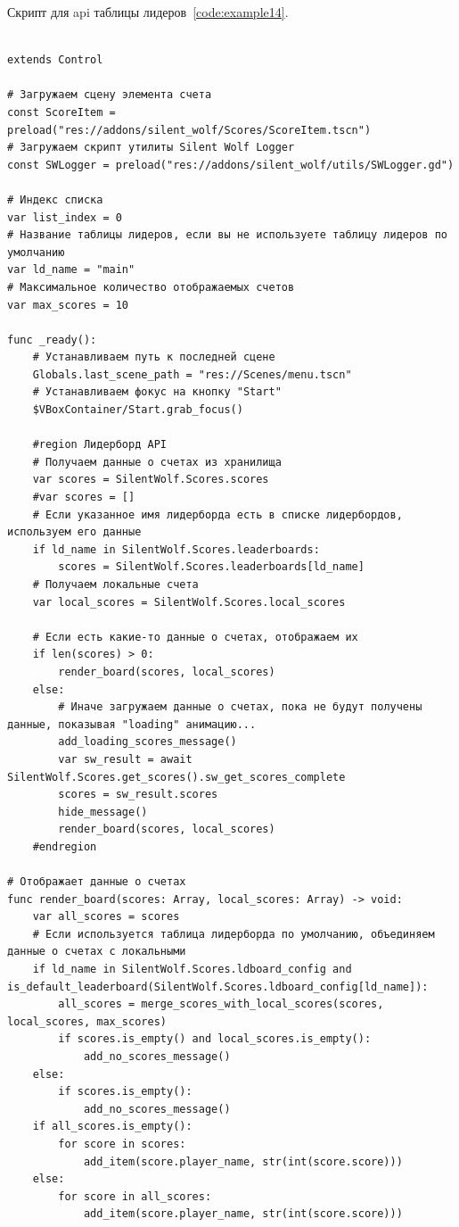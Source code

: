 \label{{subsec:ch02/sec01/sub15}Подраздел 15. Скрипт для api таблицы лидеров}
Скрипт для api таблицы лидеров~\ref{code:example14}.
\begin{code}
\vspace{-\baselineskip}\begin{verbatim}

extends Control

# Загружаем сцену элемента счета
const ScoreItem = preload("res://addons/silent_wolf/Scores/ScoreItem.tscn")
# Загружаем скрипт утилиты Silent Wolf Logger
const SWLogger = preload("res://addons/silent_wolf/utils/SWLogger.gd")

# Индекс списка
var list_index = 0
# Название таблицы лидеров, если вы не используете таблицу лидеров по умолчанию
var ld_name = "main"
# Максимальное количество отображаемых счетов
var max_scores = 10

func _ready():
    # Устанавливаем путь к последней сцене
    Globals.last_scene_path = "res://Scenes/menu.tscn"
    # Устанавливаем фокус на кнопку "Start"
    $VBoxContainer/Start.grab_focus()

    #region Лидерборд API
    # Получаем данные о счетах из хранилища
    var scores = SilentWolf.Scores.scores
    #var scores = []
    # Если указанное имя лидерборда есть в списке лидербордов, используем его данные
    if ld_name in SilentWolf.Scores.leaderboards:
        scores = SilentWolf.Scores.leaderboards[ld_name]
    # Получаем локальные счета
    var local_scores = SilentWolf.Scores.local_scores

    # Если есть какие-то данные о счетах, отображаем их
    if len(scores) > 0:
        render_board(scores, local_scores)
    else:
        # Иначе загружаем данные о счетах, пока не будут получены данные, показывая "loading" анимацию...
        add_loading_scores_message()
        var sw_result = await SilentWolf.Scores.get_scores().sw_get_scores_complete
        scores = sw_result.scores
        hide_message()
        render_board(scores, local_scores)
    #endregion

# Отображает данные о счетах
func render_board(scores: Array, local_scores: Array) -> void:
    var all_scores = scores
    # Если используется таблица лидерборда по умолчанию, объединяем данные о счетах с локальными
    if ld_name in SilentWolf.Scores.ldboard_config and is_default_leaderboard(SilentWolf.Scores.ldboard_config[ld_name]):
        all_scores = merge_scores_with_local_scores(scores, local_scores, max_scores)
        if scores.is_empty() and local_scores.is_empty():
            add_no_scores_message()
    else:
        if scores.is_empty():
            add_no_scores_message()
    if all_scores.is_empty():
        for score in scores:
            add_item(score.player_name, str(int(score.score)))
    else:
        for score in all_scores:
            add_item(score.player_name, str(int(score.score)))


\end{verbatim}
\end{code}
